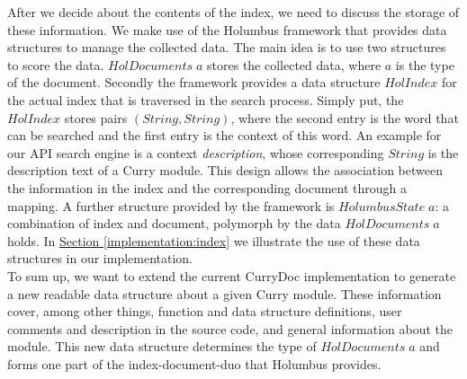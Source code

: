 \documentclass[%
	pdftex,%
	a4paper,%
	oneside,%
	chapterprefix,%
	headsepline,%
	12pt%
]{scrbook}
\newcommand{\Conid}[1]{\mathit{#1}}
\newcommand{\Varid}[1]{\mathit{#1}}
\begin{document}




After we decide about the contents of the index, we need to discuss
the storage of these information. We make use of the Holumbus
framework that provides data structures to manage the collected
data. The main idea is to use two structures to score the data.
\ensuremath{\Conid{HolDocuments}\;\Varid{a}} stores the collected data, where \ensuremath{\Varid{a}} is the type of
the document. Secondly the framework provides a data structure
\ensuremath{\Conid{HolIndex}} for the actual index that is traversed in the search
process. Simply put, the \ensuremath{\Conid{HolIndex}} stores pairs \ensuremath{(\Conid{String},\Conid{String})},
where the second entry is the word that can be searched and the first
entry is the context of this word. An example for our API search
engine is a context \emph{description}, whose corresponding \ensuremath{\Conid{String}}
is the description text of a Curry module. This design allows the
association between the information in the index and the corresponding
document through a mapping. A further structure provided by the
framework is \ensuremath{\Conid{HolumbusState}\;\Varid{a}}: a combination of index and document,
polymorph by the data \ensuremath{\Conid{HolDocuments}\;\Varid{a}} holds. In
\hyperref[implementation:index]{Section
  \ref{implementation:index}} we illustrate the use of these data
structures in our implementation.\\

To sum up, we want to extend the current CurryDoc implementation to
generate a new readable data structure about a given Curry
module. These information cover, among other things, function and data
structure definitions, user comments and description in the source
code, and general information about the module. This new data
structure determines the type of \ensuremath{\Conid{HolDocuments}\;\Varid{a}} and forms one part
of the index-document-duo that Holumbus provides. 
\end{document}
